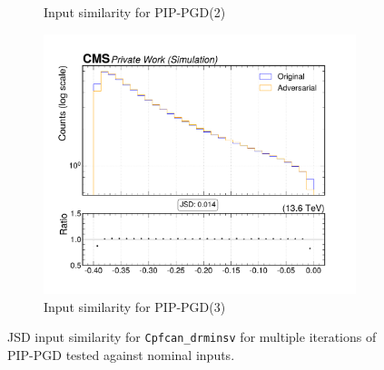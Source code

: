 \begin{figure}[htbp]
\begin{subfigure}[t]{0.32\textwidth}
    \caption*{Input similarity for PIP-PGD(2)}
  \end{subfigure}\hfill
  \begin{subfigure}[t]{0.32\textwidth}
    \includegraphics[width=\linewidth]{media/output/features/compare/combined_it_3/cmp_cpf_arr_Cpfcan_drminsv.pdf}
    \caption*{Input similarity for PIP-PGD(3)}
  \end{subfigure}

  \caption*{JSD input similarity for \texttt{Cpfcan\_drminsv} for multiple iterations of PIP-PGD tested against nominal inputs.}
  \label{fig:combined_input_Cpfcan_drminsv}
\end{figure}


